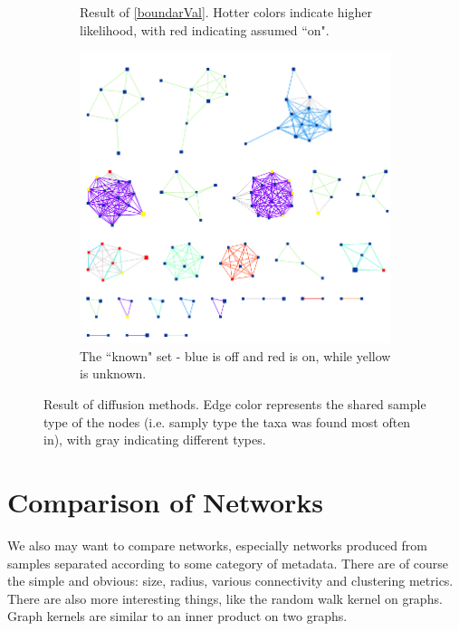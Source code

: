 \documentclass[10pt]{article}
\theoremstyle{definition}
\numberwithin{theorem}{section}
\numberwithin{definition}{section}
\numberwithin{lemma}{section}
\numberwithin{corollary}{section}
\numberwithin{clm}{section}
\numberwithin{rmk}{section}
\begin{document}
\begin{figure}
\begin{center}
\begin{subfigure}[b]{0.48\linewidth}
\begin{center}
	\end{center}
	\caption{Result of \cref{boundarVal}. Hotter colors indicate higher likelihood, with red indicating assumed ``on".}
\end{subfigure}
\begin{subfigure}[b]{0.48\linewidth}
		\begin{center}
		\includegraphics[scale = 0.3]{ranked_known_nodes.png}	
	\end{center}
	\caption{The ``known" set - blue is off and red is on, while yellow is unknown.}
\end{subfigure}
\caption{Result of diffusion methods. Edge color represents the shared sample type of the nodes (i.e. samply type the taxa was found most often in), with gray indicating different types.}\label{diffusion_sample}
\end{center}
\end{figure}	

\section{Comparison of Networks}
We also may want to compare networks, especially networks produced from samples separated according to some category of metadata. There are of course the simple and obvious: size, radius, various connectivity and clustering metrics. There are also more interesting things, like the random walk kernel on graphs. Graph kernels are similar to an inner product on two graphs.
\end{document}
